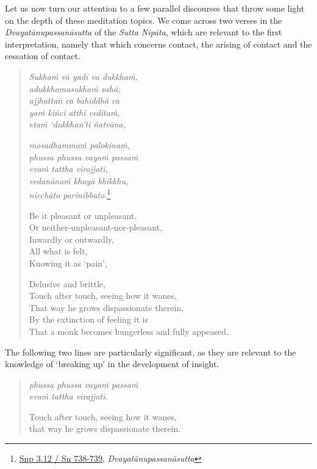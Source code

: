 Let us now turn our attention to a few parallel discourses that throw some light on the depth of these meditation topics. We come across two verses in the \emph{Dvayatānupassanāsutta} of the \emph{Sutta Nipāta}, which are relevant to the first interpretation, namely that which concerns contact, the arising of contact and the cessation of contact.

\begin{quote}
\emph{Sukhaṁ vā yadi va dukkhaṁ,}\\
\emph{adukkhamasukhaṁ sahā,}\\
\emph{ajjhattañ ca bahiddhā ca}\\
\emph{yaṁ kiñci atthi veditaṁ,}\\
\emph{etaṁ `dukkhan'ti ñatvāna,}

\emph{mosadhammaṁ palokinaṁ},\\
\emph{phussa phussa vayaṁ passaṁ}\\
\emph{evaṁ tattha virajjati,}\\
\emph{vedanānaṁ khayā bhikkhu,}\\
\emph{nicchāto parinibbuto.}\footnote{\href{https://suttacentral.net/snp3.12/pli/ms}{Snp 3.12 / Sn 738-739}, \emph{Dvayatānupassanāsutta}}

Be it pleasant or unpleasant,\\
Or neither-unpleasant-nor-pleasant,\\
Inwardly or outwardly,\\
All what is felt,\\
Knowing it as `pain',

Delusive and brittle,\\
Touch after touch, seeing how it wanes,\\
That way he grows dispassionate therein,\\
By the extinction of feeling it is\\
That a monk becomes hungerless and fully appeased.
\end{quote}

The following two lines are particularly significant, as they are relevant to the knowledge of `breaking up' in the development of insight.

\begin{quote}
\emph{phussa phussa vayaṁ passaṁ}\\
\emph{evaṁ tattha virajjati.}

Touch after touch, seeing how it wanes,\\
that way he grows dispassionate therein.
\end{quote}

